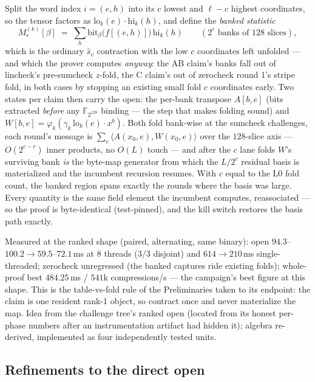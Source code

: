 \documentclass[11pt]{article}
\newcommand{\Fbig}{\mathbb{F}_{2^{128}}}
\begin{document}
Split the word index $i = (e, h)$ into its $c$ lowest and $\ell-c$ highest
coordinates, so the tensor factors as $\mathrm{lo}_k(e)\cdot
\mathrm{hi}_k(h)$, and define the \emph{banked statistic}
\[
M_e^{(k)}[\beta] \;=\; \sum_h \mathrm{bit}_\beta\!\bigl(f[(e,h)]\bigr)\,
\mathrm{hi}_k(h)
\qquad (2^c \text{ banks of } 128 \text{ slices}),
\]
which is the ordinary $\hat s_v$ contraction with the low $c$ coordinates
left unfolded --- and which the prover computes \emph{anyway}: the AB
claim's banks fall out of lincheck's pre-sumcheck $z$-fold, the C claim's
out of zerocheck round 1's stripe fold, in both cases by stopping an
existing small fold $c$ coordinates early. Two states per claim then carry
the open: the per-bank transpose $A[b,e]$ (bits extracted \emph{before}
any $\Fbig$ binding --- the step that makes folding sound) and
$W[b,e] = \varphi_k(\gamma_k\,\mathrm{lo}_k(e)\cdot x^b)$. Both fold
bank-wise at the sumcheck challenges, each round's message is
$\sum_{e}\langle A(x_0,e), W(x_0,e)\rangle$ over the $128$-slice axis
--- $O(2^{c-r})$ inner products, no $O(L)$ touch --- and after the $c$
lane folds $W$'s surviving bank \emph{is} the byte-map generator from
which the $L/2^c$ residual basis is materialized and the incumbent
recursion resumes. With $c$ equal to the L0 fold count, the banked region
spans exactly the rounds where the basis was large. Every quantity is the
same field element the incumbent computes, reassociated --- so the proof
is byte-identical (test-pinned), and the kill switch restores the basis
path exactly.

Measured at the ranked shape (paired, alternating, same binary): open
$94.3$--$100.2\to59.5$--$72.1\,$ms at 8 threads ($3/3$ disjoint) and
$614\to210\,$ms single-threaded; zerocheck unregressed (the banked
captures ride existing folds); whole-proof best $484.25\,$ms / $541$k
compressions/s --- the campaign's best figure at this shape. This is the
table-vs-fold rule of the Preliminaries taken to its endpoint: the claim
is one resident rank-1 object, so contract once and never materialize the
map. Idea from the challenge tree's ranked open (located from its honest
per-phase numbers after an instrumentation artifact had hidden it);
algebra re-derived, implemented as four independently tested units.

\subsection{Refinements to the direct open}
\label{sec:directopenrefine}
\end{document}
